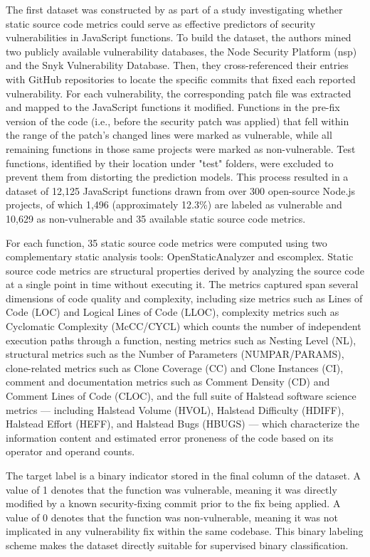 The first dataset was constructed by \citet{ferenc_challenging_2019} as part of a study investigating whether static source code metrics could serve as effective predictors of security vulnerabilities in JavaScript functions. To build the dataset, the authors mined two publicly available vulnerability databases, the Node Security Platform (nsp) and the Snyk Vulnerability Database. Then, they cross-referenced their entries with GitHub repositories to locate the specific commits that fixed each reported vulnerability. For each vulnerability, the corresponding patch file was extracted and mapped to the JavaScript functions it modified. Functions in the pre-fix version of the code (i.e., before the security patch was applied) that fell within the range of the patch's changed lines were marked as vulnerable, while all remaining functions in those same projects were marked as non-vulnerable. Test functions, identified by their location under "test" folders, were excluded to prevent them from distorting the prediction models. This process resulted in a dataset of 12,125 JavaScript functions drawn from over 300 open-source Node.js projects, of which 1,496 (approximately 12.3\%) are labeled as vulnerable and 10,629 as non-vulnerable and 35 available static source code metrics.

For each function, 35 static source code metrics were computed using two complementary static analysis tools: OpenStaticAnalyzer and escomplex. Static source code metrics are structural properties derived by analyzing the source code at a single point in time without executing it. The metrics captured span several dimensions of code quality and complexity, including size metrics such as Lines of Code (LOC) and Logical Lines of Code (LLOC), complexity metrics such as Cyclomatic Complexity (McCC/CYCL) which counts the number of independent execution paths through a function, nesting metrics such as Nesting Level (NL), structural metrics such as the Number of Parameters (NUMPAR/PARAMS), clone-related metrics such as Clone Coverage (CC) and Clone Instances (CI), comment and documentation metrics such as Comment Density (CD) and Comment Lines of Code (CLOC), and the full suite of Halstead software science metrics — including Halstead Volume (HVOL), Halstead Difficulty (HDIFF), Halstead Effort (HEFF), and Halstead Bugs (HBUGS) — which characterize the information content and estimated error proneness of the code based on its operator and operand counts.

The target label is a binary indicator stored in the final column of the dataset. A value of 1 denotes that the function was vulnerable, meaning it was directly modified by a known security-fixing commit prior to the fix being applied. A value of 0 denotes that the function was non-vulnerable, meaning it was not implicated in any vulnerability fix within the same codebase. This binary labeling scheme makes the dataset directly suitable for supervised binary classification.

